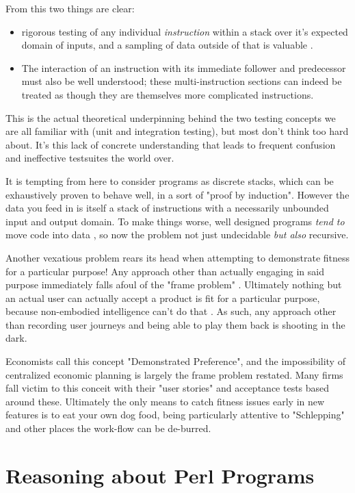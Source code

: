 \documentclass{article}
\begin{document}
From this two things are clear:
\begin{itemize}
\item rigorous testing of any individual \textit{instruction} within a stack over it's expected domain of inputs, and a sampling of data outside of that is valuable \cite{bezier2}.
\item The interaction of an instruction with its immediate follower and predecessor must also be well understood; these multi-instruction sections can indeed be treated as though they are themselves more complicated instructions.
\end{itemize}
This is the actual theoretical underpinning behind the two testing concepts we are all familiar with (unit and integration testing), but most don't think too hard about.
It's this lack of concrete understanding that leads to frequent confusion and ineffective testsuites the world over.

It is tempting from here to consider programs as discrete stacks, which can be exhaustively proven to behave well, in a sort of "proof by induction".
However the data you feed in is itself a stack of instructions with a necessarily unbounded input and output domain.
To make things worse, well designed programs \textit{tend to} move code into data \cite{bezier3}, so now the problem not just undecidable \cite{turing} \textit{but also} recursive.

Another vexatious problem rears its head when attempting to demonstrate fitness for a particular purpose!
Any approach other than actually engaging in said purpose immediately falls afoul of the "frame problem" \cite{frame}.
Ultimately nothing but an actual user can actually accept a product is fit for a particular purpose, because non-embodied intelligence can't do that \cite{chapman}.
As such, any approach other than recording user journeys and being able to play them back is shooting in the dark.

Economists call this concept "Demonstrated Preference", and the impossibility of centralized economic planning is largely the frame problem restated.
Many firms fall victim to this conceit with their "user stories" and acceptance tests based around these.
Ultimately the only means to catch fitness issues early in new features is to eat your own dog food, being particularly attentive to "Schlepping" and other places the work-flow can be de-burred.

\section{Reasoning about Perl Programs}
\end{document}
